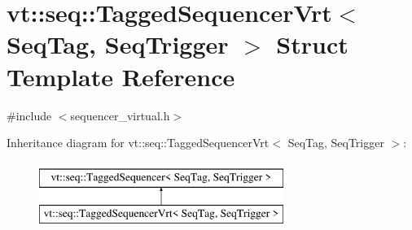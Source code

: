 \hypertarget{structvt_1_1seq_1_1_tagged_sequencer_vrt}{}\section{vt\+:\+:seq\+:\+:Tagged\+Sequencer\+Vrt$<$ Seq\+Tag, Seq\+Trigger $>$ Struct Template Reference}
\label{structvt_1_1seq_1_1_tagged_sequencer_vrt}


{\ttfamily \#include $<$sequencer\+\_\+virtual.\+h$>$}

Inheritance diagram for vt\+:\+:seq\+:\+:Tagged\+Sequencer\+Vrt$<$ Seq\+Tag, Seq\+Trigger $>$\+:\begin{figure}[H]
\begin{center}
\leavevmode
\includegraphics[height=2.000000cm]{structvt_1_1seq_1_1_tagged_sequencer_vrt}
\end{center}
\end{figure}
